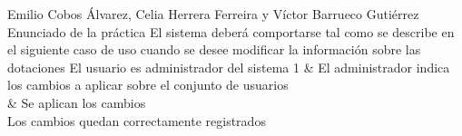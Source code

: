 {Emilio Cobos Álvarez, Celia Herrera Ferreira y Víctor Barrueco Gutiérrez}
{Enunciado de la práctica}
{}
{}
{El sistema deberá comportarse tal como se describe en el siguiente caso de uso cuando se desee modificar la información sobre las dotaciones}
{El usuario es administrador del sistema}
{
1 & El administrador indica los cambios a aplicar sobre el conjunto de usuarios \\  & Se aplican los cambios \\
}
{Los cambios quedan correctamente registrados}
{}


